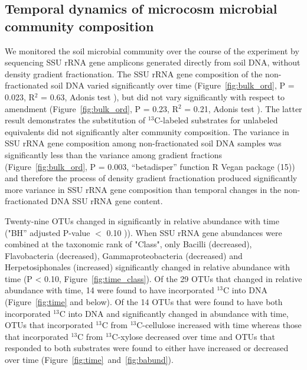 \subsection{Temporal dynamics of microcosm microbial community composition}
We monitored the soil microbial community over the course of the experiment by
sequencing SSU rRNA gene amplicons generated directly from soil DNA, without
density gradient fractionation. The SSU rRNA gene composition of the
non-fractionated soil DNA varied significantly over time (Figure~\ref{fig:bulk_ord},
P = 0.023, R$^{2}$ = 0.63, Adonis test \citet{Anderson2001a}), but did not
vary significantly with respect to amendment (Figure~\ref{fig:bulk_ord}, P = 0.23, R$^{2}$
= 0.21, Adonis test \citet{Anderson2001a}). The latter result demonstrates the substitution
of $^{13}$C-labeled substrates for unlabeled equivalents did not
significantly alter community composition. The variance in SSU rRNA gene
composition among non-fractionated soil DNA samples was significantly less
than the variance among gradient fractions (Figure~\ref{fig:bulk_ord}, P = 0.003,
“betadisper” function R Vegan package \citet{oksanen2007vegan} (15)) and
therefore the process of density gradient fractionation produced
significantly more variance in SSU rRNA gene composition than temporal
changes in the non-fractionated DNA SSU rRNA gene content.

Twenty-nine OTUs changed in significantly in relative abundance with time
("BH” adjusted P-value $<$ 0.10 \citet{YBenjamini1995})). When SSU rRNA
gene abundances were combined at the taxonomic rank of "Class", only
Bacilli (decreased), Flavobacteria (decreased), Gammaproteobacteria
(decreased) and Herpetosiphonales (increased) significantly changed in
relative abundance with time (P < 0.10, Figure~\ref{fig:time_class}). Of
the 29 OTUs that changed in relative abundance with time, 14 were found to
have incorporated $^{13}$C into DNA (Figure~\ref{fig:time} and below). Of
the 14 OTUs that were found to have both incorporated $^{13}$C into DNA
and significantly changed in abundance with time, OTUs that incorporated
$^{13}$C from $^{13}$C-cellulose increased with time whereas those that
incorporated $^{13}$C from $^{13}$C-xylose decreased over time and OTUs
that responded to both substrates were found to either have increased or
decreased over time (Figure~\ref{fig:time}~and~\ref{fig:babund}).

